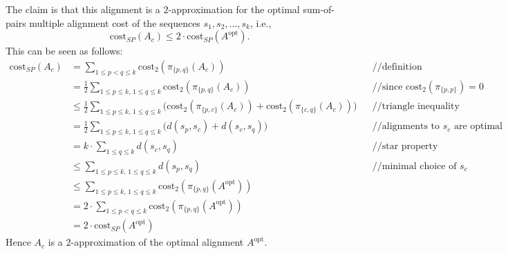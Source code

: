 {    The claim is that this alignment is a $2$-approximation for the optimal sum-of-pairs multiple alignment
    cost of the sequences $s_1, s_2, \ldots, s_k$, i.e.,
    \[
        \mathrm{cost}_{SP}(A_c) \le 2\cdot\mathrm{cost}_{SP}(A^{\mathrm{opt}}).
    \]
    This can be seen as follows:
    \[
        \begin{aligned}
            \mathrm{cost}_{SP}(A_c)
            &= \sum_{1\le p<q\le k}\mathrm{cost}_2(\pi_{\{p,q\}}(A_c)) && \text{//definition}\\
            &= \tfrac12\sum_{1\le p\le k,\,1\le q\le k}\mathrm{cost}_2(\pi_{\{p,q\}}(A_c))
            && \text{//since } \mathrm{cost}_2(\pi_{\{p,p\}})=0\\
            &\le \tfrac12\sum_{1\le p\le k,\,1\le q\le k}
            \bigl(\mathrm{cost}_2(\pi_{\{p,c\}}(A_c)) + \mathrm{cost}_2(\pi_{\{c,q\}}(A_c))\bigr)
            && \text{//triangle inequality}\\
            &= \tfrac12\sum_{1\le p\le k,\,1\le q\le k}\bigl(d(s_p, s_c) + d(s_c, s_q)\bigr)
            && \text{//alignments to } s_c \text{ are optimal}\\
            &= k\cdot\sum_{1\le q\le k} d(s_c, s_q) && \text{//star property}\\
            &\le \sum_{1\le p\le k,\,1\le q\le k} d(s_p, s_q) && \text{//minimal choice of } s_c\\
            &\le \sum_{1\le p\le k,\,1\le q\le k}\mathrm{cost}_2(\pi_{\{p,q\}}(A^{\mathrm{opt}}))\\
            &= 2\cdot\sum_{1\le p<q\le k}\mathrm{cost}_2(\pi_{\{p,q\}}(A^{\mathrm{opt}}))\\
            &= 2\cdot\mathrm{cost}_{SP}(A^{\mathrm{opt}})
        \end{aligned}
    \]
    Hence $A_c$ is a $2$-approximation of the optimal alignment $A^{\mathrm{opt}}$.}


